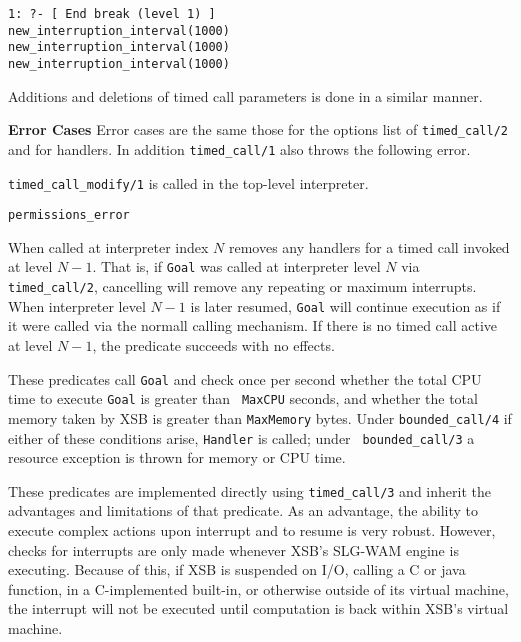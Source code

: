 \begin{description}
\begin{verbatim}
1: ?- [ End break (level 1) ]
new_interruption_interval(1000)
new_interruption_interval(1000)
new_interruption_interval(1000)
\end{verbatim}

Additions and deletions of timed call parameters is done in a similar
manner.

{\bf Error Cases} 
%
Error cases are the same those for the options list of 
{\tt timed\_call/2} and for handlers.  In addition {\tt timed\_call/1}
also throws the following error.

\bi
\item {\tt timed\_call\_modify/1} is called in the top-level interpreter.
\bi
\item {\tt permissions\_error}
\ei
\ei
%

%
When called at interpreter index $N$ removes any handlers for a timed
call invoked at level $N-1$.  That is, if {\tt Goal} was called at
interpreter level $N$ via {\tt timed\_call/2}, cancelling will remove
any repeating or maximum interrupts.  When interpreter level $N-1$ is
later resumed, {\tt Goal} will continue execution as if it were called
via the normall calling mechanism.  If there is no timed call active
at level $N-1$, the predicate succeeds with no effects.


%
These predicates call {\tt Goal} and check once per second
whether the total CPU time to execute {\tt Goal} is greater than {\tt
  MaxCPU} seconds, and whether the total memory taken by XSB is
greater than {\tt MaxMemory} bytes.  Under {\tt bounded\_call/4} if
either of these conditions arise, {\tt Handler} is called; under {\tt
  bounded\_call/3} a resource exception is thrown for memory or CPU
time.  

These predicates are implemented directly using {\tt timed\_call/3}
and inherit the advantages and limitations of that predicate.  As an
advantage, the ability to execute complex actions upon interrupt and
to resume is very robust.  However, checks for interrupts are only
made whenever XSB's SLG-WAM engine is executing.  Because of this, if
XSB is suspended on I/O, calling a C or java function, in a
C-implemented built-in, or otherwise outside of its virtual machine,
the interrupt will not be executed until computation is back within
XSB's virtual machine.


\end{description}
